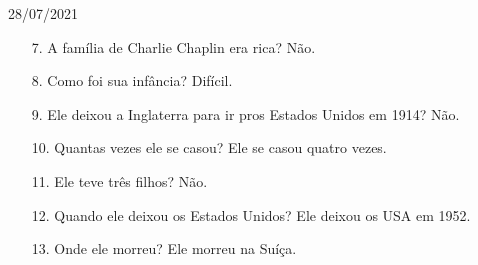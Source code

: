\documentclass{SchoolBook}
\begin{document}
\begin{day}{28/07/2021}
\begin{enumerate}
            \item[7.]  A família de Charlie Chaplin era rica?
                \response Não.
                
            \item[8.]  Como foi sua infância?
                \response Difícil.
                
            \item[9.]  Ele deixou a Inglaterra para ir pros Estados Unidos em 1914?
                \response Não.
                
            \item[10.] Quantas vezes ele se casou?
                \response Ele se casou quatro vezes.
                
            \item[11.] Ele teve três filhos?
                \response Não.
                
            \item[12.] Quando ele deixou os Estados Unidos?
                \response Ele deixou os USA em 1952.
                
            \item[13.] Onde ele morreu?
                \response Ele morreu na Suíça.
                
        \end{enumerate}
    \end{day}
\end{document}
